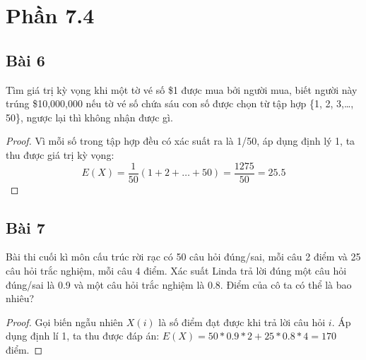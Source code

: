 \section*{Phần 7.4}
\subsection*{Bài 6}
Tìm giá trị kỳ vọng khi một tờ vé số \$1 được mua bởi người mua, biết người này trúng \$10,000,000 nếu tờ vé số chứa sáu con số được chọn từ tập hợp \{1, 2, 3,\dots, 50\}, ngược lại thì không nhận được gì.
\begin{proof}
    Vì mỗi số trong tập hợp đều có xác suất ra là 1/50, áp dụng định lý 1, ta thu được giá trị kỳ vọng:
    $$E(X)=\frac{1}{50}(1+2+\dots+50)=\frac{1275}{50}=25.5$$
\end{proof}
\subsection*{Bài 7}
Bài thi cuối kì môn cấu trúc rời rạc có 50 câu hỏi đúng/sai, mỗi câu 2 điểm và 25 câu hỏi trắc nghiệm, mỗi câu 4 điểm. Xác suất Linda trả lời đúng một câu hỏi đúng/sai là 0.9 và một câu hỏi trắc nghiệm là 0.8. Điểm của cô ta có thể là bao nhiêu?
\begin{proof}
    Gọi biến ngẫu nhiên $X(i)$ là số điểm đạt được khi trả lời câu hỏi $i$. Áp dụng định lí 1, ta thu được đáp án:
    $E(X)=50*0.9*2+25*0.8*4=170$ điểm.
\end{proof}
